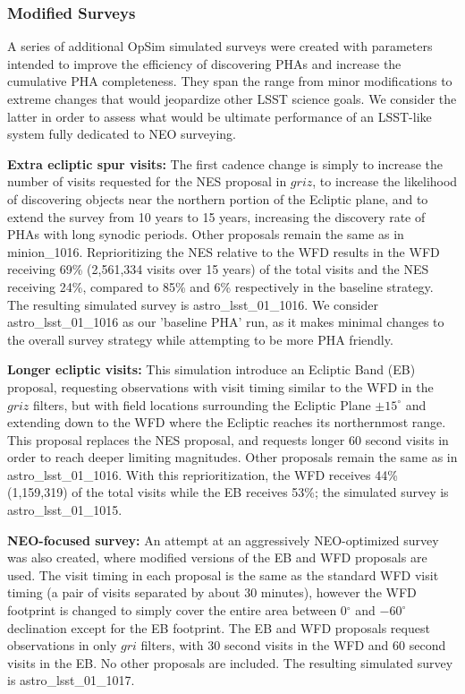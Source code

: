 \subsubsection{Modified Surveys}

A series of additional OpSim simulated surveys were created with parameters intended to improve the efficiency of discovering PHAs and increase the cumulative PHA completeness. They span the range from minor modifications to extreme changes that would
jeopardize other LSST science goals. We consider the latter in order to assess what would be ultimate performance of an
LSST-like system fully dedicated to NEO surveying.

\textbf{Extra ecliptic spur visits:} The first cadence change is simply to increase the number of visits requested for the NES proposal in $griz$, to increase the likelihood of discovering objects near the northern portion of the Ecliptic plane, and to extend the survey from 10 years to 15 years, increasing the discovery rate of PHAs with long synodic periods. Other proposals remain the same as in minion\_1016. Reprioritizing the NES relative to the WFD results in the WFD receiving 69\% (2,561,334 visits over 15 years) of the total visits and the NES receiving 24\%, compared to 85\% and 6\% respectively in the baseline strategy. The resulting simulated survey is astro\_lsst\_01\_1016.  We consider astro\_lsst\_01\_1016 as our 'baseline PHA' run, as it makes minimal changes to the overall survey strategy while attempting to be more PHA friendly.

\textbf{Longer ecliptic visits:} This simulation introduce an Ecliptic Band (EB) proposal, requesting observations with visit timing similar to the WFD in the $griz$ filters, but with field locations surrounding the Ecliptic Plane $\pm15^\circ$ and extending down to the WFD where the Ecliptic reaches its northernmost  range. This proposal replaces the NES proposal, and requests longer 60 second visits in order to reach deeper limiting magnitudes. Other proposals remain the same as in astro\_lsst\_01\_1016. With this reprioritization, the WFD receives 44\% (1,159,319) of the total visits while the EB receives 53\%; the simulated survey is astro\_lsst\_01\_1015.

\textbf{NEO-focused survey:} An attempt at an aggressively NEO-optimized survey was also created, where modified versions of the EB and WFD proposals are used. The visit timing in each proposal is the same as the standard WFD visit timing (a pair of visits separated by about 30 minutes), however the WFD footprint is changed to simply cover the entire area between 0$^\circ$ and $-60^\circ$ declination except for the EB footprint. The EB and WFD proposals request observations in only $gri$ filters, with 30 second visits in the WFD and 60 second visits in the EB. No other proposals are included. The resulting simulated survey is astro\_lsst\_01\_1017.

